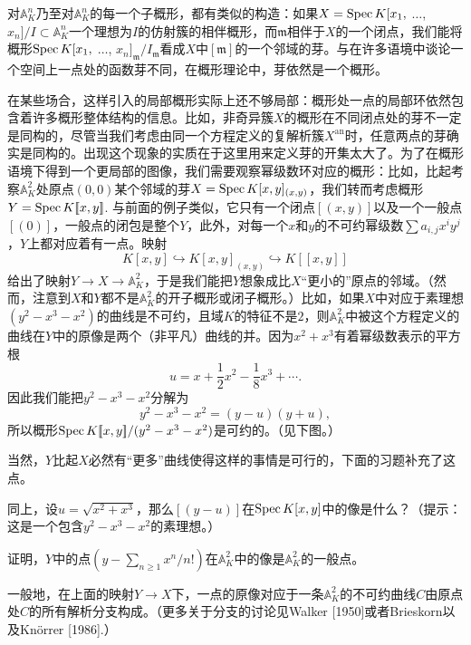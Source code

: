 对$\mathbb{A}_K^n$乃至对$\mathbb{A}_K^n$的每一个子概形，都有类似的构造：如果$X=\operatorname{Spec} K[x_1,$ $\dots$, $x_n]/I\subset \mathbb{A}_K^n$一个理想为$I$的仿射簇的相伴概形，而$\mathfrak{m}$相伴于$X$的一个闭点，我们能将概形$\operatorname{Spec} K[x_1,$ $\dots$, $x_n]_\mathfrak{m}/I_{\mathfrak{m}}$看成$X$中$[\mathfrak{m}]$的一个邻域的芽。与在许多语境中谈论一个空间上一点处的函数芽不同，在概形理论中，芽依然是一个概形。

在某些场合，这样引入的局部概形实际上还不够局部：概形处一点的局部环依然包含着许多概形整体结构的信息。比如，非奇异簇$X$的概形在不同闭点处的芽不一定是同构的，尽管当我们考虑由同一个方程定义的复解析簇$X^{\text{an}}$时，任意两点的芽确实是同构的。出现这个现象的实质在于这里用来定义芽的开集太大了。为了在概形语境下得到一个更局部的图像，我们需要观察幂级数环对应的概形：比如，比起考察$\mathbb{A}_K^2$处原点$(0,0)$某个邻域的芽$X=\operatorname{Spec} K[x,y]_{(x,y)}$，我们转而考虑概形$Y=\operatorname{Spec} K [\![x,y]\!]$. 与前面的例子类似，它只有一个闭点$[(x,y)]$以及一个一般点$[(0)]$，一般点的闭包是整个$Y$，此外，对每一个$x$和$y$的不可约幂级数$\sum a_{i,j}x^iy^j$，$Y$上都对应着有一点。映射
\[
	K[x,y]\hookrightarrow K[x,y]_{(x,y)}\hookrightarrow K[\![x,y]\!]
\]
给出了映射$Y\to X\to \mathbb{A}_K^2$，于是我们能把$Y$想象成比$X$“更小的”原点的邻域。（然而，注意到$X$和$Y$都不是$\mathbb{A}_K^2$的开子概形或闭子概形。）比如，如果$X$中对应于素理想$(y^2-x^3-x^2)$的曲线是不可约，且域$K$的特征不是$2$，则$\mathbb{A}_K^2$中被这个方程定义的曲线在$Y$中的原像是两个（非平凡）曲线的并。因为$x^2+x^3$有着幂级数表示的平方根
\[
	u=x+\frac{1}{2}x^2-\frac{1}{8}x^3+\cdots.
\]
因此我们能把$y^2-x^3-x^2$分解为
\[
	y^2-x^3-x^2=(y-u)(y+u),
\]
所以概形$\operatorname{Spec}  K[\![x,y]\!]/(y^2-x^3-x^2)$是可约的。（见下图。）


当然，$Y$比起$X$必然有“更多”曲线使得这样的事情是可行的，下面的习题补充了这点。

\begin{exe}
	\begin{compactenum}[(a)]
		\item 同上，设$u=\sqrt{x^2+x^3}$，那么$[(y-u)]$在$\operatorname{Spec} K[x,y]$中的像是什么？（提示：这是一个包含$y^2-x^3-x^2$的素理想。）
		\item 证明，$Y$中的点$(y-\sum_{n\geq 1}x^n/n!)$在$\mathbb{A}_K^2$中的像是$\mathbb{A}_K^2$的一般点。
	\end{compactenum}
\end{exe}

一般地，在上面的映射$Y\to X$下，一点的原像对应于一条$\mathbb{A}_K^2$的不可约曲线$C$由原点处$C$的所有解析分支构成。（更多关于分支的讨论见Walker [1950]或者Brieskorn以及Kn\"{o}rrer [1986].）

